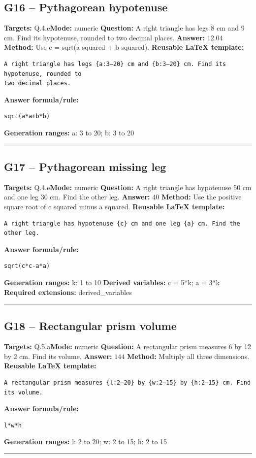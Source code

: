 \documentclass[11pt]{article}
\begin{document}
\subsection{G16 -- Pythagorean hypotenuse}
\textbf{Targets:} Q.4.e\quad\textbf{Mode:} numeric
\textbf{Question:} A right triangle has legs 8 cm and 9 cm. Find its hypotenuse, rounded to two decimal places.
\textbf{Answer:} \(12.04\)
\textbf{Method:} Use c = sqrt(a squared + b squared).
\textbf{Reusable LaTeX template:}
\begin{verbatim}
A right triangle has legs {a:3–20} cm and {b:3–20} cm. Find its hypotenuse, rounded to
two decimal places.
\end{verbatim}
\textbf{Answer formula/rule:}
\begin{verbatim}
sqrt(a*a+b*b)
\end{verbatim}
\textbf{Generation ranges:} a: 3 to 20; b: 3 to 20
\medskip\hrule\medskip
\subsection{G17 -- Pythagorean missing leg}
\textbf{Targets:} Q.4.e\quad\textbf{Mode:} numeric
\textbf{Question:} A right triangle has hypotenuse 50 cm and one leg 30 cm. Find the other leg.
\textbf{Answer:} \(40\)
\textbf{Method:} Use the positive square root of c squared minus a squared.
\textbf{Reusable LaTeX template:}
\begin{verbatim}
A right triangle has hypotenuse {c} cm and one leg {a} cm. Find the other leg.
\end{verbatim}
\textbf{Answer formula/rule:}
\begin{verbatim}
sqrt(c*c-a*a)
\end{verbatim}
\textbf{Generation ranges:} k: 1 to 10
\textbf{Derived variables:} c = 5*k; a = 3*k
\textbf{Required extensions:} derived\_variables
\medskip\hrule\medskip
\subsection{G18 -- Rectangular prism volume}
\textbf{Targets:} Q.5.a\quad\textbf{Mode:} numeric
\textbf{Question:} A rectangular prism measures 6 by 12 by 2 cm. Find its volume.
\textbf{Answer:} \(144\)
\textbf{Method:} Multiply all three dimensions.
\textbf{Reusable LaTeX template:}
\begin{verbatim}
A rectangular prism measures {l:2–20} by {w:2–15} by {h:2–15} cm. Find its volume.
\end{verbatim}
\textbf{Answer formula/rule:}
\begin{verbatim}
l*w*h
\end{verbatim}
\textbf{Generation ranges:} l: 2 to 20; w: 2 to 15; h: 2 to 15
\medskip\hrule\medskip
\end{document}

